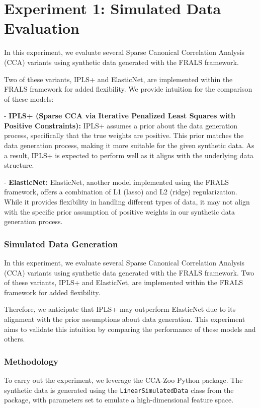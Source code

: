 \section{Experiment 1: Simulated Data Evaluation}\label{subsec:exp1}

In this experiment, we evaluate several Sparse Canonical Correlation Analysis (CCA) variants using synthetic data generated with the FRALS framework.

Two of these variants, IPLS+ and ElasticNet, are implemented within the FRALS framework for added flexibility.
We provide intuition for the comparison of these models:

- \textbf{IPLS+ (Sparse CCA via Iterative Penalized Least Squares with Positive Constraints):} IPLS+ assumes a prior about the data generation process, specifically that the true weights are positive.
This prior matches the data generation process, making it more suitable for the given synthetic data.
As a result, IPLS+ is expected to perform well as it aligns with the underlying data structure.

- \textbf{ElasticNet:} ElasticNet, another model implemented using the FRALS framework, offers a combination of L1 (lasso) and L2 (ridge) regularization.
While it provides flexibility in handling different types of data, it may not align with the specific prior assumption of positive weights in our synthetic data generation process.

\subsubsection{Simulated Data Generation}\label{subsubsec:simulated-data-generation}

In this experiment, we evaluate several Sparse Canonical Correlation Analysis (CCA) variants using synthetic data generated with the FRALS framework. Two of these variants, IPLS+ and ElasticNet, are implemented within the FRALS framework for added flexibility.

Therefore, we anticipate that IPLS+ may outperform ElasticNet due to its alignment with the prior assumptions about data generation. This experiment aims to validate this intuition by comparing the performance of these models and others.

\subsubsection{Methodology}

To carry out the experiment, we leverage the CCA-Zoo Python package. The synthetic data is generated using the \texttt{LinearSimulatedData} class from the package, with parameters set to emulate a high-dimensional feature space.

